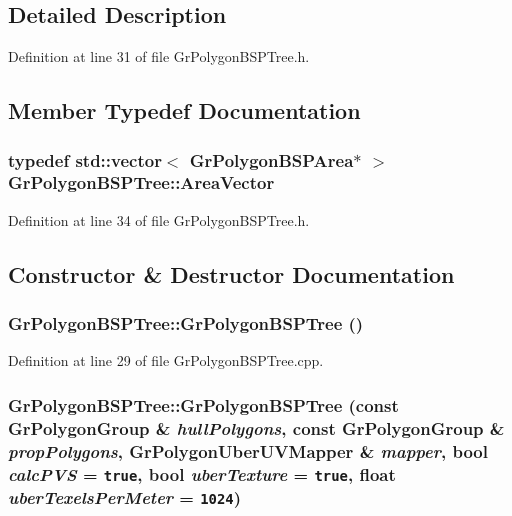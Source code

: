 \subsection{Detailed Description}


Definition at line 31 of file GrPolygonBSPTree.h.

\subsection{Member Typedef Documentation}
\hypertarget{class_gr_polygon_b_s_p_tree_d2b320fddca0d87a66ba1e091e9fccb9}{
\subsubsection[{AreaVector}]{\setlength{\rightskip}{0pt plus 5cm}typedef std::vector$<$ {\bf GrPolygonBSPArea}$\ast$ $>$ {\bf GrPolygonBSPTree::AreaVector}}}
\label{class_gr_polygon_b_s_p_tree_d2b320fddca0d87a66ba1e091e9fccb9}




Definition at line 34 of file GrPolygonBSPTree.h.

\subsection{Constructor \& Destructor Documentation}
\hypertarget{class_gr_polygon_b_s_p_tree_d9c2c1971129708001171e299493cc69}{
\subsubsection[{GrPolygonBSPTree}]{\setlength{\rightskip}{0pt plus 5cm}GrPolygonBSPTree::GrPolygonBSPTree ()}}
\label{class_gr_polygon_b_s_p_tree_d9c2c1971129708001171e299493cc69}




Definition at line 29 of file GrPolygonBSPTree.cpp.\hypertarget{class_gr_polygon_b_s_p_tree_faa29115ffaf59d991ce42734d2369b7}{
\subsubsection[{GrPolygonBSPTree}]{\setlength{\rightskip}{0pt plus 5cm}GrPolygonBSPTree::GrPolygonBSPTree (const {\bf GrPolygonGroup} \& {\em hullPolygons}, \/  const {\bf GrPolygonGroup} \& {\em propPolygons}, \/  {\bf GrPolygonUberUVMapper} \& {\em mapper}, \/  bool {\em calcPVS} = {\tt true}, \/  bool {\em uberTexture} = {\tt true}, \/  float {\em uberTexelsPerMeter} = {\tt 1024})}}
\label{class_gr_polygon_b_s_p_tree_faa29115ffaf59d991ce42734d2369b7}




